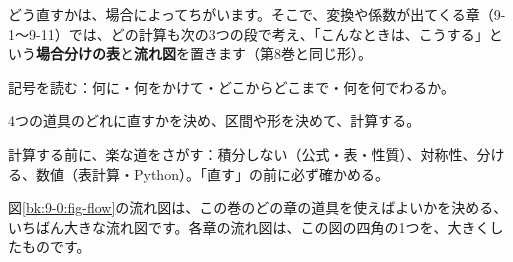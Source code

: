 
\label{bk:9-0:dan}どう直すかは、場合によってちがいます。そこで、変換や係数が出てくる章（9-1〜9-11）では、どの計算も次の3つの段で考え、「こんなときは、こうする」という\textbf{場合分けの表}と\textbf{流れ図}を置きます（第8巻と同じ形）。\par\vspace{3pt}
\noindent{}\enspace 記号を読む：何に・何をかけて・どこからどこまで・何を何でわるか。\par\vspace{2pt}
\noindent{}\enspace 4つの道具のどれに直すかを決め、区間や形を決めて、計算する。\par\vspace{2pt}
\noindent{}\enspace 計算する前に、楽な道をさがす：積分しない（公式・表・性質）、対称性、分ける、数値（表計算・Python）。「直す」の前に必ず確かめる。

図\ref{bk:9-0:fig-flow}の流れ図は、この巻のどの章の道具を使えばよいかを決める、いちばん大きな流れ図です。各章の流れ図は、この図の四角の1つを、大きくしたものです。


